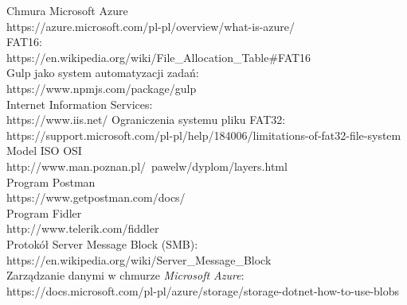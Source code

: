 \begin{thebibliography}{1}
Chmura Microsoft Azure
\\
https://azure.microsoft.com/pl-pl/overview/what-is-azure/
\\
FAT16:
\\
https://en.wikipedia.org/wiki/File\_Allocation\_Table\#FAT16
\\
Gulp jako system automatyzacji zadań:
\\ 
https://www.npmjs.com/package/gulp
\\
 Internet Information Services:
\\
https://www.iis.net/
Ograniczenia systemu pliku FAT32:
\\ https://support.microsoft.com/pl-pl/help/184006/limitations-of-fat32-file-system
\\
Model ISO OSI
\\
http://www.man.poznan.pl/~pawelw/dyplom/layers.html
\\
Program Postman
\\
https://www.getpostman.com/docs/
\\
Program Fidler
\\
http://www.telerik.com/fiddler
\\
Protokół Server Message Block (SMB):
\\
https://en.wikipedia.org/wiki/Server\_Message\_Block
\\
Zarządzanie danymi w chmurze \textit{Microsoft Azure}:
\\
https://docs.microsoft.com/pl-pl/azure/storage/storage-dotnet-how-to-use-blobs
\\

\end{thebibliography}
